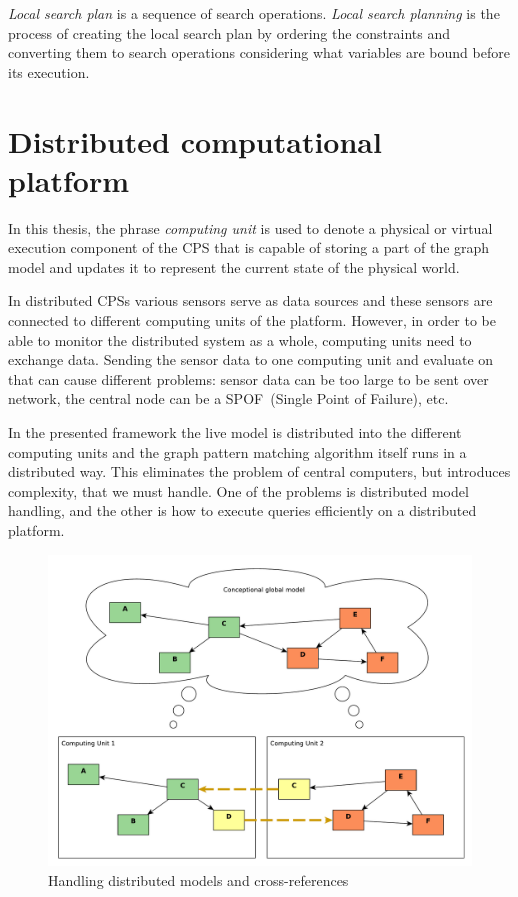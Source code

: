 \emph{Local search plan} is a sequence of search operations.
\emph{Local search planning} is the process of creating the local search plan by ordering the constraints and converting them to search operations considering what variables are bound before its execution.

\section{Distributed computational platform}

In this thesis, the phrase \emph{computing unit} is used to denote a physical or virtual execution component of the CPS that is capable of storing a part of the graph model and updates it to represent the current state of the physical world.

In distributed CPSs various sensors serve as data sources and these sensors are connected to different computing units of the platform. However, in order to be able to monitor the distributed system as a whole, computing units need to exchange data.
Sending the sensor data to one computing unit and evaluate on that can cause different problems: 
sensor data can be too large to be sent over network, the central node can be a SPOF~(Single Point of Failure), etc. 

In the presented framework the live model is distributed into the different computing units and the graph pattern matching algorithm itself runs in a distributed way. 
This eliminates the problem of central computers, but introduces complexity, that we must handle.
One of the problems is distributed model handling, and the other is how to execute queries efficiently on a distributed platform.




\begin{figure}[h]
	\begin{center}
		\includegraphics[width=\textwidth]{figures/distributed-model-handling.pdf}
		\caption{Handling distributed models and cross-references}
		\label{fig:distributed-model-handling}
	\end{center}
\end{figure}

